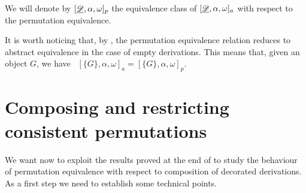 \begin{notation}
	We will denote by $[\underline{\mathscr{D}}, \alpha, \omega]_p$ the equivalence class of $[\underline{\mathscr{D}}, \alpha, \omega]_a$ with respect to the permutation equivalence.
\end{notation}

\begin{remark}\label{rem:ugu}
	It is worth noticing that, by , the permutation equivalence relation reduces to abstract equivalence in the case of empty derivations. This means that, given an object $G$, we have ~$[\{G\}, \alpha, \omega]_a=[\{G\}, \alpha, \omega]_p$.
\end{remark}

\section{Composing and restricting consistent permutations}

We want now to exploit the results proved at the end of  to study the behaviour of permutation equivalence with respect to composition of decorated derivations. As a first step we need to establish some technical points.

